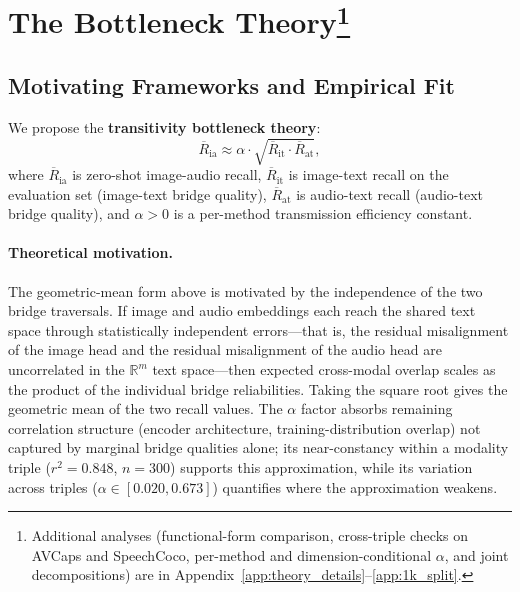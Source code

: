 \documentclass{article}
\newcommand{\avgR}{\overline{R}}
\begin{document}
\section[The Bottleneck Theory]{The Bottleneck Theory\protect\footnote{Additional analyses (functional-form comparison, cross-triple checks on AVCaps and SpeechCoco, per-method and dimension-conditional $\alpha$, and joint decompositions) are in Appendix~\ref{app:theory_details}--\ref{app:1k_split}.}}
\label{sec:theory}

\subsection{Motivating Frameworks and Empirical Fit}

We propose the \textbf{transitivity bottleneck theory}:
\begin{equation}
  \avgR_\mathrm{ia} \approx \alpha \cdot \sqrt{\avgR_\mathrm{it} \cdot \avgR_\mathrm{at}},
  \label{eq:theory}
\end{equation}
where $\avgR_\mathrm{ia}$ is zero-shot image-audio recall, $\avgR_\mathrm{it}$ is image-text recall on the evaluation set (image-text bridge quality), $\avgR_\mathrm{at}$ is audio-text recall (audio-text bridge quality), and $\alpha > 0$ is a per-method transmission efficiency constant.

\paragraph{Theoretical motivation.}
The geometric-mean form above is motivated by the independence of the two bridge traversals.
If image and audio embeddings each reach the shared text space through statistically independent errors---that is, the residual misalignment of the image head and the residual misalignment of the audio head are uncorrelated in the $\mathbb{R}^m$ text space---then expected cross-modal overlap scales as the product of the individual bridge reliabilities.
Taking the square root gives the geometric mean of the two recall values.
The $\alpha$ factor absorbs remaining correlation structure (encoder architecture, training-distribution overlap) not captured by marginal bridge qualities alone; its near-constancy within a modality triple ($r^2=0.848$, $n=300$) supports this approximation, while its variation across triples ($\alpha\in[0.020, 0.673]$) quantifies where the approximation weakens.
\end{document}
